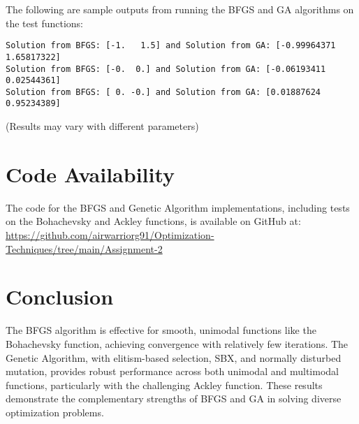 \documentclass[12pt,a4paper,oneside]{paper} %
\begin{document}
The following are sample outputs from running the BFGS and GA algorithms on the test functions:

\begin{verbatim}
Solution from BFGS: [-1.   1.5] and Solution from GA: [-0.99964371  1.65817322]
Solution from BFGS: [-0.  0.] and Solution from GA: [-0.06193411  0.02544361]
Solution from BFGS: [ 0. -0.] and Solution from GA: [0.01887624 0.95234389]
\end{verbatim}
(Results may vary with different parameters)

\section{Code Availability}

The code for the BFGS and Genetic Algorithm implementations, including tests on the Bohachevsky and Ackley functions, is available on GitHub at:  
\url{https://github.com/airwarriorg91/Optimization-Techniques/tree/main/Assignment-2}

\section{Conclusion}

The BFGS algorithm is effective for smooth, unimodal functions like the Bohachevsky function, achieving convergence with relatively few iterations. The Genetic Algorithm, with elitism-based selection, SBX, and normally disturbed mutation, provides robust performance across both unimodal and multimodal functions, particularly with the challenging Ackley function. These results demonstrate the complementary strengths of BFGS and GA in solving diverse optimization problems.

\end{document}
